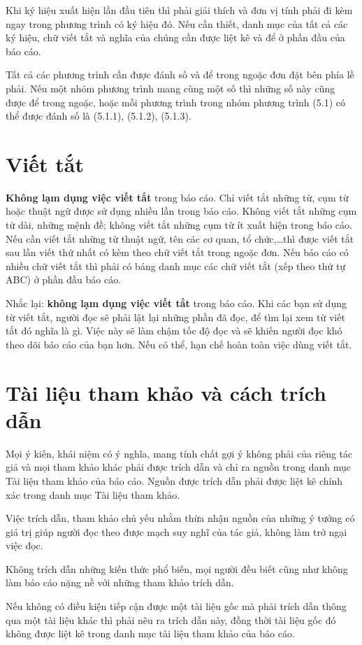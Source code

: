 Khi ký hiệu xuất hiện lần đầu tiên thì phải giải thích và đơn vị tính phải đi kèm ngay trong phương trình có ký hiệu đó. Nếu cần thiết, danh mục của tất cả các ký hiệu, chữ viết tắt và nghĩa của chúng cần được liệt kê và để ở phần đầu của báo cáo.

Tất cả các phương trình cần được đánh số và để trong ngoặc đơn đặt bên phía lề phải. Nếu một nhóm phương trình mang cùng một số thì những số này cũng được để trong ngoặc, hoặc mỗi phương trình trong nhóm phương trình (5.1) có thể được đánh số là (5.1.1), (5.1.2), (5.1.3).

\section{Viết tắt}

\textbf{Không lạm dụng việc viết tắt} trong báo cáo. Chỉ viết tắt những từ, cụm từ hoặc thuật ngữ được sử dụng nhiều lần trong báo cáo. Không viết tắt những cụm từ dài, những mệnh đề; không viết tắt những cụm từ ít xuất hiện trong báo cáo. Nếu cần viết tắt những từ thuật ngữ, tên các cơ quan, tổ chức,\ldots thì được viết tắt sau lần viết thứ nhất có kèm theo chữ viết tắt trong ngoặc đơn. Nếu báo cáo có nhiều chữ viết tắt thì phải có bảng danh mục các chữ viết tắt (xếp theo thứ tự ABC) ở phần đầu báo cáo.

Nhắc lại: \textbf{không lạm dụng việc viết tắt} trong báo cáo. Khi các bạn sử dụng từ viết tắt, người đọc sẽ phải lật lại những phần đã đọc, để tìm lại xem từ viết tắt đó nghĩa là gì. Việc này sẽ làm chậm tốc độ đọc và sẽ khiến người đọc khó theo dõi báo cáo của bạn hơn. Nếu có thể, hạn chế hoàn toàn việc dùng viết tắt.

\section{Tài liệu tham khảo và cách trích dẫn}

Mọi ý kiến, khái niệm có ý nghĩa, mang tính chất gợi ý không phải của riêng tác giả và mọi tham khảo khác phải được trích dẫn và chỉ ra nguồn trong danh mục Tài liệu tham khảo của báo cáo. Nguồn được trích dẫn phải được liệt kê chính xác trong danh mục Tài liệu tham khảo.

Việc trích dẫn, tham khảo chủ yếu nhằm thừa nhận nguồn của những ý tưởng có giá trị giúp người đọc theo được mạch suy nghĩ của tác giả, không làm trở ngại việc đọc.


Không trích dẫn những kiến thức phổ biến, mọi người đều biết cũng như không làm báo cáo nặng nề với những tham khảo trích dẫn.

Nếu không có điều kiện tiếp cận được một tài liệu gốc mà phải trích dẫn thông qua một tài liệu khác thì phải nêu ra trích dẫn này, đồng thời tài liệu gốc đó không được liệt kê trong danh mục tài liệu tham khảo của báo cáo.
